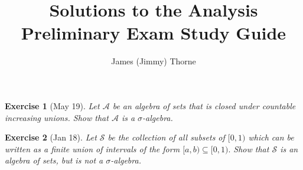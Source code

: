 \documentclass[12pt]{book}
\title{Solutions to the Analysis Preliminary Exam Study Guide}
\author{James (Jimmy) Thorne}
\newtheorem{ex}{Exercise}
\begin{document}
	\maketitle
	
	\begin{ex}[May 19]
		Let $\mathcal{A}$ be an algebra of sets that is closed under countable increasing unions.  Show that
		$\mathcal{A}$ is a $\sigma$-algebra.
	\end{ex}
	
	\begin{ex}[Jan 18]
		Let $\mathcal{S}$ be the collection of all subsets of $[0,1)$ which can be written as a finite union
		of intervals of the form $[a,b) \subseteq [0,1).$  Show that $\mathcal{S}$ is an algebra of sets, but is not 
		a $\sigma$-algebra.
	\end{ex}

	
\end{document}
